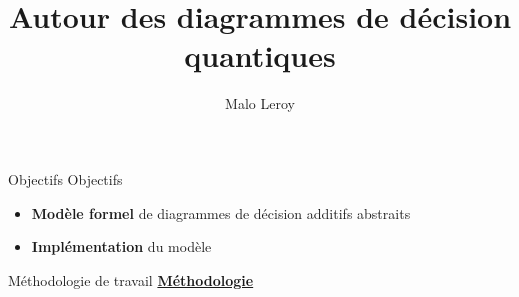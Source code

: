 \documentclass[french, 12pt]{beamer}
\title{Autour des diagrammes de décision quantiques}
\author{Malo Leroy}
\institute{Parcours recherche -- CentraleSupélec}
\begin{document}
\begin{frame}
    \titlepage
\end{frame}





\begin{frame}{Objectifs}
    Objectifs
    \begin{itemize}
        \item \textbf{Modèle formel} de diagrammes de décision additifs abstraits
        \item \textbf{Implémentation} du modèle
    \end{itemize}
\end{frame}

\begin{frame}{Méthodologie de travail}
\underline{\textbf{Méthodologie}}
\small{
\begin{center}
\end{center}
}
\end{frame}
\end{document}
